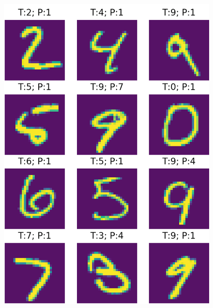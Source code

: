 \documentclass{article}
\begin{document}
\begin{figure}
\centering
\begin{minipage}[t]{.5\textwidth}
  \centering
  \includegraphics[width=0.9\linewidth]{correct_class.png}
  \label{fig:right}
\end{minipage}%
\begin{minipage}[t]{.5\textwidth}
  \centering

\end{minipage}
\end{figure}
\end{document}
